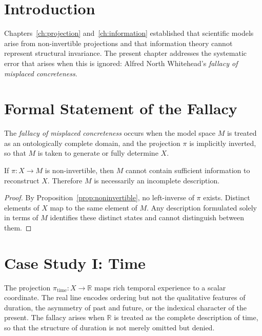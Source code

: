 \documentclass[11pt,openany]{book}
\begin{document}
\section{Introduction}
\label{sec:introduction-misplaced}

Chapters~\ref{ch:projection} and~\ref{ch:information}
established that scientific models arise from
non-invertible projections and that information theory
cannot represent structural invariance. The present chapter
addresses the systematic error that arises when this is
ignored: Alfred North Whitehead's \emph{fallacy of
misplaced concreteness}.

\section{Formal Statement of the Fallacy}
\label{sec:formal-statement}

\begin{definition}
\label{def:misplaced}
The \emph{fallacy of misplaced concreteness} occurs when
the model space $M$ is treated as an ontologically complete
domain, and the projection $\pi$ is implicitly inverted, so
that $M$ is taken to generate or fully determine $X$.
\end{definition}

\begin{proposition}
\label{prop:incomplete}
If $\pi : X \to M$ is non-invertible, then $M$ cannot
contain sufficient information to reconstruct $X$.
Therefore $M$ is necessarily an incomplete description.
\end{proposition}

\begin{proof}
By Proposition~\ref{prop:noninvertible}, no left-inverse of
$\pi$ exists. Distinct elements of $X$ map to the same
element of $M$. Any description formulated solely in terms
of $M$ identifies these distinct states and cannot
distinguish between them.
\end{proof}

\section{Case Study I: Time}
\label{sec:time}

The projection $\pi_{\mathrm{time}} : X \to \mathbb{R}$
maps rich temporal experience to a scalar coordinate. The
real line encodes ordering but not the qualitative features
of duration, the asymmetry of past and future, or the
indexical character of the present. The fallacy arises when
$\mathbb{R}$ is treated as the complete description of time,
so that the structure of duration is not merely omitted but
denied.
\end{document}
